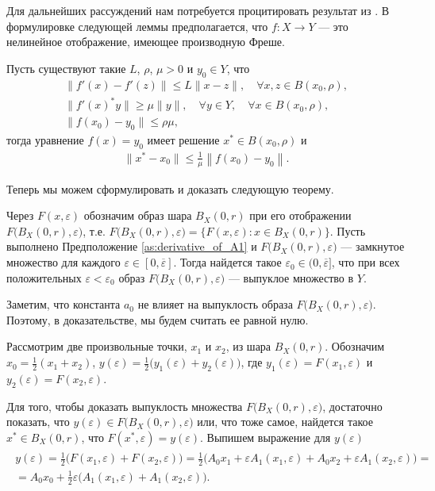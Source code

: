 \documentclass[../main.tex]{subfiles}
\begin{document}
Для дальнейших рассуждений нам потребуется процитировать результат из \cite{Polyak2001, Polyak1964}.  В формулировке следующей леммы предполагается, что $f:X \to Y$ --- это нелинейное отображение, имеющее производную Фреше.
\begin{lemma}\label{lem:Polyak_lemma}
	Пусть существуют такие $L$, $\rho$, $\mu > 0$ и $y_0 \in Y$, что 
	\begin{gather*}
		\| f'(x) - f'(z) \| \leqslant L \| x - z\|, \quad \forall x,z \in B(x_0,\rho), \\
		\| f'(x)^*y \| \geqslant \mu \|y \|, \quad \forall y \in Y, \quad \forall x \in B(x_0, \rho), \\
		\| f(x_0) - y_0 \| \leqslant \rho \mu,
	\end{gather*}
	тогда уравнение $f(x) = y_0$ имеет решение $x^* \in B(x_0,\rho)$ и 
	\begin{gather*}
		\|x^* - x_0\| \leqslant \frac{1}{\mu} \left\| f(x_0) - y_0 \right\|.
	\end{gather*}
\end{lemma}
Теперь мы можем сформулировать и доказать следующую теорему.
\begin{theorem}\label{th:ImageConvexity}
	Через $F(x,\varepsilon)$ обозначим образ шара $B_X(0, r)$ при его отображении $F\big(B_X(0,r),\varepsilon\big)$, т.е. $F\big(B_X(0,r),\varepsilon\big) = \big\{F(x,\varepsilon): x\in B_X(0, r)\big\}$.
	Пусть выполнено Предположение \ref{as:derivative_of_A1} и $F\big(B_X(0,r),\varepsilon\big)$ --- замкнутое множество для каждого  $\varepsilon \in [0, \overline{\varepsilon}]$. Тогда найдется такое $ \varepsilon_0 \in (0, \overline{\varepsilon}]$, что при всех положительных $\varepsilon < \varepsilon_0$ образ $F\big(B_X(0,r),\varepsilon\big)$ --- выпуклое множество в $Y$. 
\end{theorem}
\doc
Заметим, что константа $a_0$ не влияет на выпуклость образа $F\big(B_X(0,r),\varepsilon\big)$. 
Поэтому, в доказательстве, мы будем считать ее равной нулю.

Рассмотрим две произвольные точки, $x_1$ и $x_2$, из шара $B_X(0,r)$. 
Обозначим $x_0 = \frac{1}{2}(x_1 + x_2)$, $y(\varepsilon) = \frac{1}{2}\big(y_1(\varepsilon)  + y_2(\varepsilon)\big)$, где $y_1(\varepsilon) = F(x_1, \varepsilon)$ и $y_2(\varepsilon) = F(x_2, \varepsilon)$. 

Для того, чтобы доказать выпуклость множества $F\big(B_X(0,r),\varepsilon\big)$, достаточно показать, что $y(\varepsilon) \in F\big(B_X(0,r),\varepsilon\big)$ или, что тоже самое, найдется такое $x^* \in B_X(0,r) $, что $F(x^*, \varepsilon) = y(\varepsilon) $.
Выпишем выражение для $y(\varepsilon)$
\begin{gather}\label{y}
	\begin{gathered}
		y(\varepsilon)=
		\frac{1}{2} \big(
		F(x_1,\varepsilon)+ 
		F(x_2,\varepsilon)
		\big) = 
		\frac{1}{2} \big(
		A_0 x_1 +
		\varepsilon A_1(x_1,\varepsilon) +
		A_0 x_2 +
		\varepsilon A_1(x_2,\varepsilon) 
		\big) = \\ = A_0 x_0 + 
		\frac{1}{2} \varepsilon \big( 
		A_1(x_1,\varepsilon)+ 
		A_1(x_2,\varepsilon)
		\big).
	\end{gathered}
\end{gather}
\end{document}
